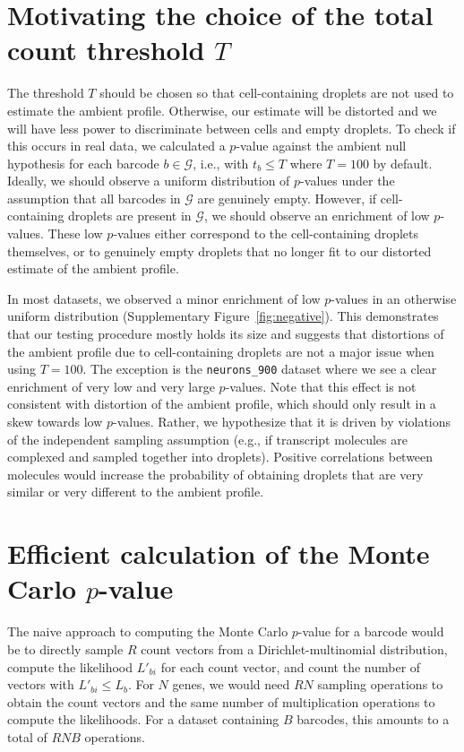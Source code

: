 \documentclass{article}
\newcommand{\code}[1]{\texttt{#1}}
\begin{document}
\section{Motivating the choice of the total count threshold $T$}
The threshold $T$ should be chosen so that cell-containing droplets are not used to estimate the ambient profile.
Otherwise, our estimate will be distorted and we will have less power to discriminate between cells and empty droplets.
To check if this occurs in real data, we calculated a $p$-value against the ambient null hypothesis for each barcode $b \in \mathcal{G}$, 
i.e., with $t_b \le T$ where $T = 100$ by default.
Ideally, we should observe a uniform distribution of $p$-values under the assumption that all barcodes in $\mathcal{G}$ are genuinely empty.
However, if cell-containing droplets are present in $\mathcal{G}$, we should observe an enrichment of low $p$-values.
These low $p$-values either correspond to the cell-containing droplets themselves,
or to genuinely empty droplets that no longer fit to our distorted estimate of the ambient profile.

In most datasets, we observed a minor enrichment of low $p$-values in an otherwise uniform distribution (Supplementary Figure~\ref{fig:negative}). 
This demonstrates that our testing procedure mostly holds its size and suggests that distortions of the ambient profile due to cell-containing droplets are not a major issue when using $T=100$.
The exception is the \code{neurons\_900} dataset where we see a clear enrichment of very low and very large $p$-values.
Note that  this effect is not consistent with distortion of the ambient profile, which should only result in a skew towards low $p$-values.
Rather, we hypothesize that it is driven by violations of the independent sampling assumption (e.g., if transcript molecules are complexed and sampled together into droplets).
Positive correlations between molecules would increase the probability of obtaining droplets that are very similar or very different to the ambient profile.

\section{Efficient calculation of the Monte Carlo $p$-value}
The naive approach to computing the Monte Carlo $p$-value for a barcode would be to directly sample $R$ count vectors from a Dirichlet-multinomial distribution,
compute the likelihood $L'_{bi}$ for each count vector, and count the number of vectors with $L'_{bi} \le L_{b}$.
For $N$ genes, we would need $RN$ sampling operations to obtain the count vectors and the same number of multiplication operations to compute the likelihoods.
For a dataset containing $B$ barcodes, this amounts to a total of $RNB$ operations.
\end{document}
